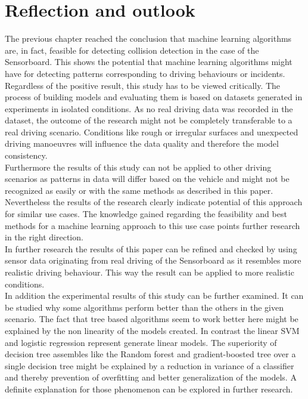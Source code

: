 \chapter{Reflection and outlook}
The previous chapter reached the conclusion that machine learning algorithms are, in fact, feasible for detecting collision detection in the case of the Sensorboard. This shows the potential that machine learning algorithms might have for detecting patterns corresponding to driving behaviours or incidents.
\\
Regardless of the positive result, this study has to be viewed critically. The process of building models and evaluating them is based on datasets generated in experiments in isolated conditions. As no real driving data was recorded in the dataset, the outcome of the research might not be completely transferable to a real driving scenario. Conditions like rough or irregular surfaces and unexpected driving manoeuvres will influence the data quality and therefore the model consistency. 
\\
Furthermore the results of this study can not be applied to other driving scenarios as patterns in data will differ based on the vehicle and might not be recognized as easily or with the same methods as described in this paper.
\\
Nevertheless the results of the research clearly indicate potential of this approach for similar use cases. The knowledge gained regarding the feasibility and best methods for a machine learning approach to this use case points further research in the right direction.
\\
In further research the results of this paper can be refined and checked by using sensor data originating from real driving of the Sensorboard as it resembles more realistic driving behaviour. This way the result can be applied to more realistic conditions. 
\\
In addition the experimental results of this study can be further examined. It can be studied why some algorithms perform better than the others in the given scenario. The fact that tree based algorithms seem to work better here might be explained by the non linearity of the models created. In contrast the linear SVM and logistic regression represent generate linear models. The superiority of decision tree assembles like  the Random forest and gradient-boosted tree over a single decision tree might be explained by a reduction in variance of a classifier and thereby prevention of overfitting and better generalization of the models. A definite explanation for those phenomenon can be explored in further research.
